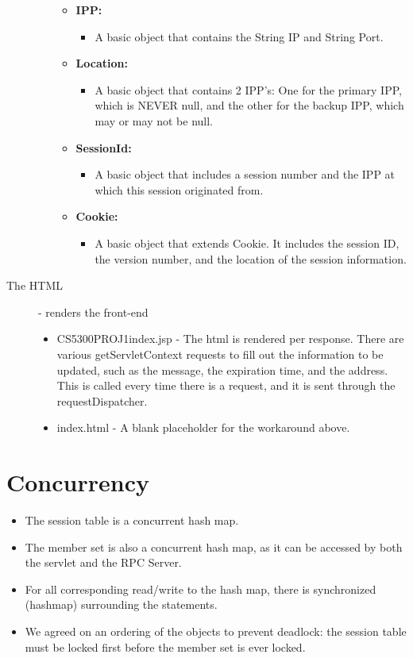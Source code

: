 \documentclass{article}
\begin{document}
\begin{description}
\begin{itemize}
\begin{itemize}
	    \item \textbf{IPP:}
		\begin{itemize}
		   \item A basic object that contains the String IP and String Port.
		\end{itemize}
	    \item \textbf{Location:}
		\begin{itemize}
		  \item A basic object that contains 2 IPP's: One for the primary IPP, which is NEVER null, and the other for the backup IPP, which may or may not be null.
		\end{itemize}
	    \item \textbf{SessionId:}
		\begin{itemize}
		  \item A basic object that includes a session number and the IPP at which this session originated from.
		\end{itemize}
	    \item \textbf{Cookie:}
		\begin {itemize}
		  \item A basic object that extends Cookie. It includes the session ID, the version number, and the location of the session information.
		\end {itemize}
          \end{itemize}    
      \end{itemize}
    \item[The HTML] - renders the front-end 
      \begin{itemize}
        \item CS5300PROJ1index.jsp - The html is rendered per response. There are various getServletContext requests to fill out the information to be updated, such as the message, the expiration time, and the address. This is called every time there is a request, and it is sent through the requestDispatcher.
        \item index.html - A blank placeholder for the workaround above.
      \end{itemize}

  \end{description}

\section{Concurrency}
  \begin{itemize}
    \item The session table is a concurrent hash map.
    \item The member set is also a concurrent hash map, as it can be accessed by both the servlet and the RPC Server.
    \item For all corresponding read/write to the hash map, there is synchronized (hashmap) surrounding the statements.
    \item We agreed on an ordering of the objects to prevent deadlock: the session table must be locked first before the member set is ever locked.
  \end{itemize}
\end{document}
